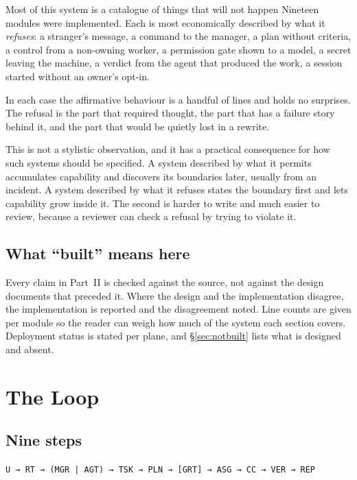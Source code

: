 \documentclass[11pt]{article}
\newcommand{\code}[1]{\texttt{\small #1}}
\begin{document}
\begin{claimbox}{Most of this system is a catalogue of things that will not happen}
Nineteen modules were implemented. Each is most economically described by what it \emph{refuses}: a stranger's message, a command to the manager, a plan without criteria, a control from a non-owning worker, a permission gate shown to a model, a secret leaving the machine, a verdict from the agent that produced the work, a session started without an owner's opt-in.

In each case the affirmative behaviour is a handful of lines and holds no surprises. The refusal is the part that required thought, the part that has a failure story behind it, and the part that would be quietly lost in a rewrite.
\end{claimbox}

This is not a stylistic observation, and it has a practical consequence for how such systems should be specified. A system described by what it permits accumulates capability and discovers its boundaries later, usually from an incident. A system described by what it refuses states the boundary first and lets capability grow inside it. The second is harder to write and much easier to review, because a reviewer can check a refusal by trying to violate it.

\subsection{What ``built'' means here}

Every claim in Part~II is checked against the source, not against the design documents that preceded it. Where the design and the implementation disagree, the implementation is reported and the disagreement noted. Line counts are given per module so the reader can weigh how much of the system each section covers. Deployment status is stated per plane, and \S\ref{sec:notbuilt} lists what is designed and absent.

\section{The Loop}
\label{sec:loop}

\subsection{Nine steps}

\begin{center}
\code{U → RT → (MGR | AGT) → TSK → PLN → [GRT] → ASG → CC → VER → REP}
\end{center}
\end{document}
